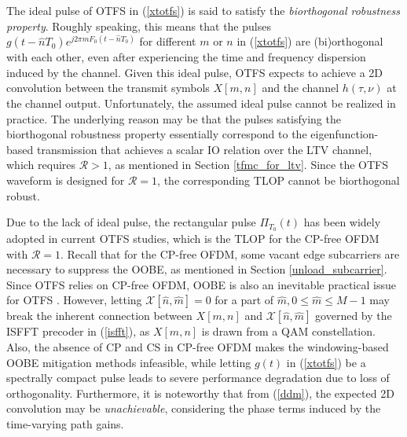 \documentclass[journal]{IEEEtran}
\begin{document}
{The ideal pulse of OTFS in (\ref{xtotfs}) is said to satisfy the \emph{biorthogonal robustness property}\cite{otfs_wcnc_2017}. 
Roughly speaking, this means that the pulses $g(t-\hat nT_0)e^{j2\pi \hat m F_0 (t-\hat n T_0)}$ for different $m$ or $n$ in (\ref{xtotfs}) are (bi)orthogonal with each other, even after experiencing the time and frequency dispersion induced by the channel. } 
Given this ideal pulse, OTFS expects to achieve a 2D convolution between the transmit symbols $X[m,n]$ and the channel $h(\tau, \nu)$ at the channel output\cite{hadani_otfs_2018}.
Unfortunately, the assumed ideal pulse cannot be realized in practice\cite{hadani_otfs_2018}. The underlying reason may be that the pulses satisfying the biorthogonal robustness property essentially correspond to the eigenfunction-based transmission that achieves a scalar IO relation over the LTV channel, which requires $\mathcal R>1$, as mentioned in Section \ref{tfmc_for_ltv}.
Since the OTFS waveform is designed for $\mathcal R=1$, the corresponding TLOP cannot be biorthogonal robust.

Due to the lack of ideal pulse, the rectangular pulse $\Pi_{T_0}(t)$ has been widely adopted in current OTFS studies\cite{viterbo_twc_2018}, which is the TLOP for the CP-free OFDM with $\mathcal R=1$. Recall that for the CP-free OFDM, some vacant edge subcarriers are necessary to suppress the OOBE, as mentioned in Section \ref{unload_subcarrier}. Since OTFS relies on CP-free OFDM, OOBE is also an inevitable practical issue for OTFS \cite{shen2022error}.
However, letting $\mathcal X[\hat n,\hat m]=0$ for a part of $\hat m, 0\le \hat m \le M-1$ may break the inherent connection between $X[m, n]$ and $\mathcal X[\hat n,\hat m]$ governed by the ISFFT precoder in (\ref{isfft}), as $X[m, n]$ is drawn from a QAM constellation.
Also, the absence of CP and CS in CP-free OFDM makes the windowing-based OOBE mitigation methods infeasible, while letting $g(t)$ in (\ref{xtotfs}) be a spectrally compact pulse leads to severe performance degradation \cite{viterbo_tvt_19} due to loss of orthogonality.
Furthermore, it is noteworthy that from (\ref{ddm}),
the expected 2D convolution may be \emph{unachievable}, considering the phase terms induced by the time-varying path gains.


\vspace*{-2mm}
\end{document}
